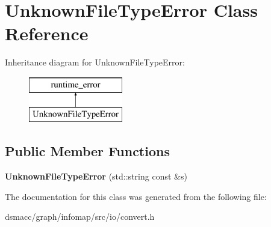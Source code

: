 \hypertarget{classUnknownFileTypeError}{}\section{Unknown\+File\+Type\+Error Class Reference}
\label{classUnknownFileTypeError}
Inheritance diagram for Unknown\+File\+Type\+Error\+:\begin{figure}[H]
\begin{center}
\leavevmode
\includegraphics[height=2.000000cm]{classUnknownFileTypeError}
\end{center}
\end{figure}
\subsection*{Public Member Functions}
\begin{DoxyCompactItemize}
\item 
\mbox{\label{classUnknownFileTypeError_ad30f168d5c1f62345711313d40c36b31}} 
{\bfseries Unknown\+File\+Type\+Error} (std\+::string const \&s)
\end{DoxyCompactItemize}


The documentation for this class was generated from the following file\+:\begin{DoxyCompactItemize}
\item 
dsmacc/graph/infomap/src/io/convert.\+h\end{DoxyCompactItemize}
